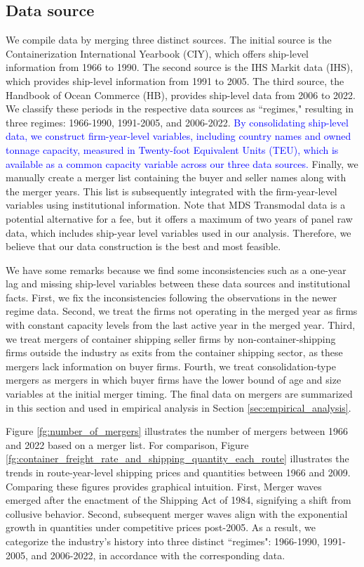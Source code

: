 \documentclass[10pt]{article}
\begin{document}
\subsection{Data source}\label{sec:data_source}
We compile data by merging three distinct sources.
The initial source is the Containerization International Yearbook (CIY), which offers ship-level information from 1966 to 1990. 
The second source is the IHS Markit data (IHS), which provides ship-level information from 1991 to 2005. 
The third source, the Handbook of Ocean Commerce (HB), provides ship-level data from 2006 to 2022.
We classify these periods in the respective data sources as ``regimes," resulting in three regimes: 1966-1990, 1991-2005, and 2006-2022.
\textcolor{blue}{By consolidating ship-level data, we construct firm-year-level variables, including country names and owned tonnage capacity, measured in Twenty-foot Equivalent Units (TEU), which is available as a common capacity variable across our three data sources.}
Finally, we manually create a merger list containing the buyer and seller names along with the merger years. 
This list is subsequently integrated with the firm-year-level variables using institutional information. 
Note that MDS Transmodal data is a potential alternative for a fee, but it offers a maximum of two years of panel raw data, which includes ship-year level variables used in our analysis.
Therefore, we believe that our data construction is the best and most feasible.

We have some remarks because we find some inconsistencies such as a one-year lag and missing ship-level variables between these data sources and institutional facts.
First, we fix the inconsistencies following the observations in the newer regime data. 
Second, we treat the firms not operating in the merged year as firms with constant capacity levels from the last active year in the merged year. %
Third, we treat mergers of container shipping seller firms by non-container-shipping firms outside the industry as exits from the container shipping sector, as these mergers lack information on buyer firms.
Fourth, we treat consolidation-type mergers as mergers in which buyer firms have the lower bound of age and size variables at the initial merger timing.
The final data on mergers are summarized in this section and used in empirical analysis in Section \ref{sec:empirical_analysis}. 



Figure \ref{fg:number_of_mergers} illustrates the number of mergers between 1966 and 2022 based on a merger list.
For comparison, Figure \ref{fg:container_freight_rate_and_shipping_quantity_each_route} illustrates the trends in route-year-level shipping prices and quantities between 1966 and 2009.
Comparing these figures provides graphical intuition. 
First, Merger waves emerged after the enactment of the Shipping Act of 1984, signifying a shift from collusive behavior.
Second, subsequent merger waves align with the exponential growth in quantities under competitive prices post-2005.
As a result, we categorize the industry's history into three distinct ``regimes": 1966-1990, 1991-2005, and 2006-2022, in accordance with the corresponding data.
\end{document}

